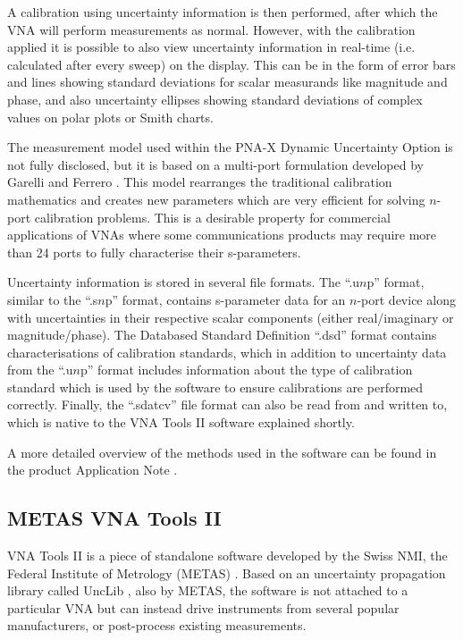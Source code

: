 \documentclass[../thesis/thesis.tex]{subfiles}
\begin{document}
\begin{refsection}
A calibration using uncertainty information is then performed, after which the VNA will perform measurements as normal. However, with the calibration applied it is possible to also view uncertainty information in real-time (i.e. calculated after every sweep) on the display. This can be in the form of error bars and lines showing standard deviations for scalar measurands like magnitude and phase, and also uncertainty ellipses showing standard deviations of complex values on polar plots or Smith charts.

The measurement model used within the PNA-X Dynamic Uncertainty Option is not fully disclosed, but it is based on a multi-port formulation developed by Garelli and Ferrero \cite{Garelli_2012}. This model rearranges the traditional calibration mathematics and creates new parameters which are very efficient for solving $n$-port calibration problems. This is a desirable property for commercial applications of VNAs where some communications products may require more than 24 ports to fully characterise their s-parameters.

Uncertainty information is stored in several file formats. The ``.u$n$p'' format, similar to the ``.s$n$p'' format, contains s-parameter data for an $n$-port device along with uncertainties in their respective scalar components (either real/imaginary or magnitude/phase). The Databased Standard Definition ``.dsd'' format contains characterisations of calibration standards, which in addition to uncertainty data from the ``.u$n$p'' format includes information about the type of calibration standard which is used by the software to ensure calibrations are performed correctly. Finally, the ``.sdatcv'' file format can also be read from and written to, which is native to the VNA Tools II software explained shortly. 

A more detailed overview of the methods used in the software can be found in the product Application Note \cite{Keysight_2019}.

\subsection{METAS VNA Tools II}

VNA Tools II is a piece of standalone software developed by the Swiss NMI, the Federal Institute of Metrology (METAS) \cite{VNATools}. Based on an uncertainty propagation library called UncLib \cite{UncLib}, also by METAS, the software is not attached to a particular VNA but can instead drive instruments from several popular manufacturers, or post-process existing measurements.


\end{refsection}
\end{document}
